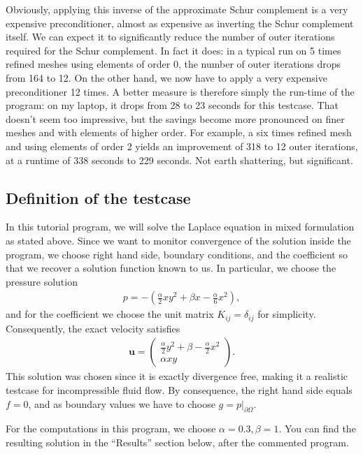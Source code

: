 \documentclass{article}
\renewcommand{\vec}[1]{\mathbf{#1}}
\begin{document}
Obviously, applying this inverse of the approximate Schur complement is a very
expensive preconditioner, almost as expensive as inverting the Schur
complement itself. We can expect it to significantly reduce the number of
outer iterations required for the Schur complement. In fact it does: in a
typical run on 5 times refined meshes using elements of order 0, the number of
outer iterations drops from 164 to 12. On the other hand, we now have to apply
a very expensive preconditioner 12 times. A better measure is therefore simply
the run-time of the program: on my laptop, it drops from 28 to 23 seconds for
this testcase. That doesn't seem too impressive, but the savings become more
pronounced on finer meshes and with elements of higher order. For example, a
six times refined mesh and using elements of order 2 yields an improvement of
318 to 12 outer iterations, at a runtime of 338 seconds to 229 seconds. Not
earth shattering, but significant.



\subsection*{Definition of the testcase}

In this tutorial program, we will solve the Laplace equation in mixed
formulation as stated above. Since we want to monitor convergence of the
solution inside the program, we choose right hand side, boundary conditions,
and the coefficient so that we recover a solution function known to us. In
particular, we choose the pressure solution
\begin{align*}
  p = -\left(\frac \alpha 2 xy^2 + \beta x - \frac \alpha 6 x^2\right),
\end{align*}
and for the coefficient we choose the unit matrix $K_{ij}=\delta_{ij}$ for
simplicity. Consequently, the exact velocity satisfies
\begin{align*}
  \vec u = 
  \begin{pmatrix}
    \frac \alpha 2 y^2 + \beta - \frac \alpha 2 x^2 \\
    \alpha xy
  \end{pmatrix}.
\end{align*}
This solution was chosen since it is exactly divergence free, making it a
realistic testcase for incompressible fluid flow. By consequence, the right
hand side equals $f=0$, and as boundary values we have to choose
$g=p|_{\partial\Omega}$.

For the computations in this program, we choose $\alpha=0.3,\beta=1$. You can
find the resulting solution in the ``Results'' section below, after the
commented program.
\end{document}
